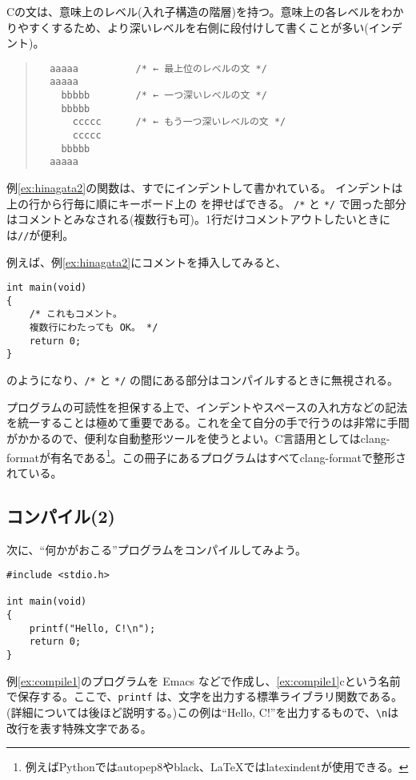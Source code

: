 Cの文は、意味上のレベル(入れ子構造の階層)を持つ。意味上の各レベルをわかりやすくするため、より深いレベルを右側に段付けして書くことが多い(インデント)。
\begin{quote}
    \begin{verbatim}
  aaaaa          /* ← 最上位のレベルの文 */
  aaaaa
    bbbbb        /* ← 一つ深いレベルの文 */
    bbbbb
      ccccc      /* ← もう一つ深いレベルの文 */
      ccccc
    bbbbb
  aaaaa
\end{verbatim}
\end{quote}
例\ref{ex:hinagata2}の関数は、すでにインデントして書かれている。
インデントは上の行から行毎に順にキーボード上の \tabkey を押せばできる。
\texttt{/*} と \texttt{*/} で囲った部分はコメントとみなされる(複数行も可)。1行だけコメントアウトしたいときには\texttt{//}が便利。

例えば、例\ref{ex:hinagata2}にコメントを挿入してみると、
\begin{reidai}
    \begin{verbatim}
int main(void)
{
    /* これもコメント。
    複数行にわたっても OK。 */
    return 0;
}
\end{verbatim}
\end{reidai} \noindent
のようになり、\texttt{/*} と \texttt{*/} の間にある部分はコンパイルするときに無視される。

プログラムの可読性を担保する上で、インデントやスペースの入れ方などの記法を統一することは極めて重要である。これを全て自分の手で行うのは非常に手間がかかるので、便利な自動整形ツールを使うとよい。C言語用としてはclang-formatが有名である\footnote{例えばPythonではautopep8やblack、\LaTeX ではlatexindentが使用できる。}。この冊子にあるプログラムはすべてclang-formatで整形されている。

\subsection{コンパイル(2)}

次に、``何かがおこる''プログラムをコンパイルしてみよう。
\begin{reidai}\label{ex:compile1}
    \begin{verbatim}
#include <stdio.h>

int main(void)
{
    printf("Hello, C!\n");
    return 0;
}
\end{verbatim}
\end{reidai} \noindent
例\ref{ex:compile1}のプログラムを Emacs などで作成し、\ref{ex:compile1}cという名前で保存する。ここで、\texttt{printf} は、文字を出力する標準ライブラリ関数である。(詳細については後ほど説明する。)この例は``Hello, C!''を出力するもので、\texttt{\textbackslash n}は改行を表す特殊文字である。

